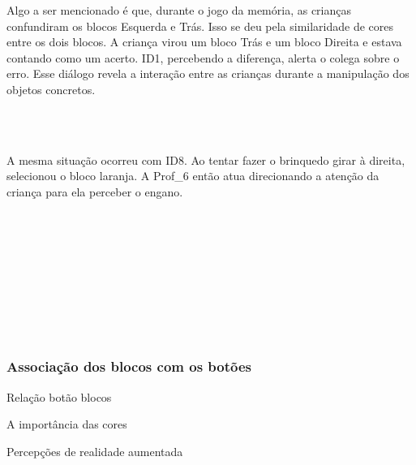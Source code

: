 Algo a ser mencionado é que, durante o jogo da memória, as crianças confundiram os blocos Esquerda e Trás. Isso se deu pela similaridade de cores entre os dois blocos. A criança virou um bloco Trás e um bloco Direita e estava contando como um acerto. ID1, percebendo a diferença, alerta o colega sobre o erro. Esse diálogo revela a interação entre as crianças durante a manipulação dos objetos concretos. 

\begin{dialogo}
     \\
     \\ 
\end{dialogo}

A mesma situação ocorreu com ID8. Ao tentar fazer o brinquedo girar à direita, selecionou o bloco laranja. A Prof\_6 então atua direcionando a atenção da criança para ela perceber o engano. 

\begin{dialogo}
     \\
     \\
     \\
      \\
     \\
      \\
     \\
      \\
\end{dialogo}

\subsubsection{Associação dos blocos com os botões}

Relação botão blocos

A importância das cores

Percepções de realidade aumentada

